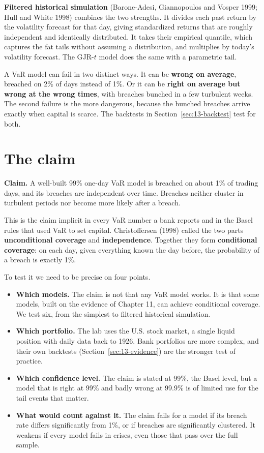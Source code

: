 \textbf{Filtered historical simulation} (Barone-Adesi, Giannopoulos and Vosper 1999; Hull and White 1998) combines the two strengths. It divides each past return by the volatility forecast for that day, giving standardized returns that are roughly independent and identically distributed. It takes their empirical quantile, which captures the fat tails without assuming a distribution, and multiplies by today's volatility forecast. The GJR-$t$ model does the same with a parametric tail.

A VaR model can fail in two distinct ways. It can be \textbf{wrong on average}, breached on 2\% of days instead of 1\%. Or it can be \textbf{right on average but wrong at the wrong times}, with breaches bunched in a few turbulent weeks. The second failure is the more dangerous, because the bunched breaches arrive exactly when capital is scarce. The backtests in Section~\ref{sec:13-backtest} test for both.

\section{The claim}
\label{sec:13-claim}

\begin{callout}
\textbf{Claim.} A well-built 99\% one-day VaR model is breached on about 1\% of trading days, and its breaches are independent over time. Breaches neither cluster in turbulent periods nor become more likely after a breach.
\end{callout}

This is the claim implicit in every VaR number a bank reports and in the Basel rules that used VaR to set capital. Christoffersen (1998) called the two parts \textbf{unconditional coverage} and \textbf{independence}. Together they form \textbf{conditional coverage}: on each day, given everything known the day before, the probability of a breach is exactly 1\%.

To test it we need to be precise on four points.

\begin{itemize}
  \item \textbf{Which models.} The claim is not that any VaR model works. It is that some models, built on the evidence of Chapter 11, can achieve conditional coverage. We test six, from the simplest to filtered historical simulation.
  \item \textbf{Which portfolio.} The lab uses the U.S. stock market, a single liquid position with daily data back to 1926. Bank portfolios are more complex, and their own backtests (Section~\ref{sec:13-evidence}) are the stronger test of practice.
  \item \textbf{Which confidence level.} The claim is stated at 99\%, the Basel level, but a model that is right at 99\% and badly wrong at 99.9\% is of limited use for the tail events that matter.
  \item \textbf{What would count against it.} The claim fails for a model if its breach rate differs significantly from 1\%, or if breaches are significantly clustered. It weakens if every model fails in crises, even those that pass over the full sample.
\end{itemize}

